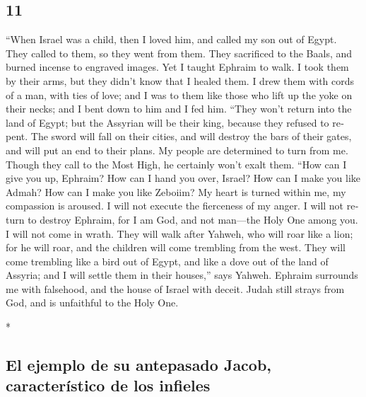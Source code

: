 \begin{paracol}{2}
\switchcolumn
\begin{otherlanguage}{english}

\hypertarget{section-21}{%
\section{11}\label{section-21}}

 ``When Israel was a child, then I loved him, and called
my son out of Egypt.  They called to them, so they went
from them. They sacrificed to the Baals, and burned incense to engraved
images.  Yet I taught Ephraim to walk. I took them by
their arms, but they didn't know that I healed them.  I
drew them with cords of a man, with ties of love; and I was to them like
those who lift up the yoke on their necks; and I bent down to him and I
fed him.  ``They won't return into the land of Egypt; but
the Assyrian will be their king, because they refused to repent.
 The sword will fall on their cities, and will destroy the
bars of their gates, and will put an end to their plans. 
My people are determined to turn from me. Though they call to the Most
High, he certainly won't exalt them.  ``How can I give you
up, Ephraim? How can I hand you over, Israel? How can I make you like
Admah? How can I make you like Zeboiim? My heart is turned within me, my
compassion is aroused.  I will not execute the fierceness
of my anger. I will not return to destroy Ephraim, for I am God, and not
man---the Holy One among you. I will not come in wrath. 
They will walk after Yahweh, who will roar like a lion; for he will
roar, and the children will come trembling from the west.
 They will come trembling like a bird out of Egypt, and
like a dove out of the land of Assyria; and I will settle them in their
houses,'' says Yahweh.  Ephraim surrounds me with
falsehood, and the house of Israel with deceit. Judah still strays from
God, and is unfaithful to the Holy One.

\end{otherlanguage}

\switchcolumn[0]*

\hypertarget{el-ejemplo-de-su-antepasado-jacob-caracteruxedstico-de-los-infieles}{%
\subsection{El ejemplo de su antepasado Jacob, característico de los
infieles}\label{el-ejemplo-de-su-antepasado-jacob-caracteruxedstico-de-los-infieles}}


\end{paracol}
